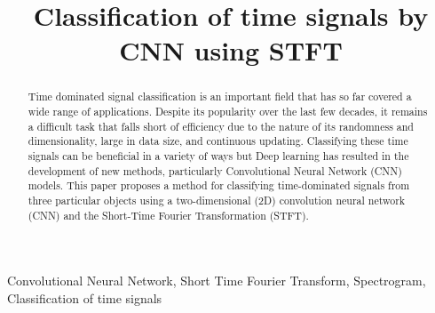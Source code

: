 \documentclass[conference]{IEEEtran}
\begin{document}
\title{Classification of time signals by CNN using STFT}


\author{
\and
{}
\and
{}
\and
{}
}

\maketitle

\begin{abstract}
Time dominated signal classification is an important field  that has so far covered a wide range of applications. Despite its popularity over the last few decades, it remains a difficult task that falls short of efficiency due to the nature of its  randomness and dimensionality, large in data size, and continuous updating. Classifying these time signals can be beneficial in a variety of ways but Deep learning has resulted in the development of new methods, particularly Convolutional Neural Network (CNN) models. This paper proposes a method for classifying time-dominated signals from three particular objects using a two-dimensional (2D) convolution neural network (CNN) and the Short-Time Fourier Transformation (STFT).
\end{abstract}

\begin{IEEEkeywords}
Convolutional Neural Network, Short Time Fourier Transform, Spectrogram, Classification of time signals
\end{IEEEkeywords}
\end{document}
